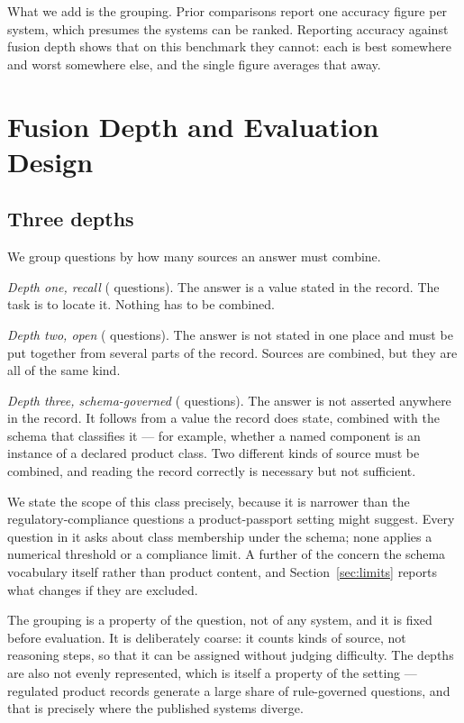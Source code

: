 \documentclass[conference]{IEEEtran}
\begin{document}
What we add is the grouping. Prior comparisons report one accuracy figure per
system, which presumes the systems can be ranked. Reporting accuracy against
fusion depth shows that on this benchmark they cannot: each is best somewhere
and worst somewhere else, and the single figure averages that away.

\section{Fusion Depth and Evaluation Design}
\subsection{Three depths}
We group questions by how many sources an answer must combine.

\emph{Depth one, recall} (\NRecall{} questions). The answer is a value stated in
the record. The task is to locate it. Nothing has to be combined.

\emph{Depth two, open} (\NOpen{} questions). The answer is not stated in one
place and must be put together from several parts of the record. Sources are
combined, but they are all of the same kind.

\emph{Depth three, schema-governed} (\NLogic{} questions). The answer is not
asserted anywhere in the record. It follows from a value the record does state,
combined with the schema that classifies it --- for example, whether a named
component is an instance of a declared product class. Two different kinds of
source must be combined, and reading the record correctly is necessary but not
sufficient.

We state the scope of this class precisely, because it is narrower than the
regulatory-compliance questions a product-passport setting might suggest. Every
question in it asks about class membership under the schema; none applies a
numerical threshold or a compliance limit. A further \ScopeNarrow{} of the
\NLogic{} concern the schema vocabulary itself rather than product content, and
Section~\ref{sec:limits} reports what changes if they are excluded.

The grouping is a property of the question, not of any system, and it is fixed
before evaluation. It is deliberately coarse: it counts kinds of source, not
reasoning steps, so that it can be assigned without judging difficulty. The
depths are also not evenly represented, which is itself a property of the
setting --- regulated product records generate a large share of rule-governed
questions, and that is precisely where the published systems diverge.
\end{document}
